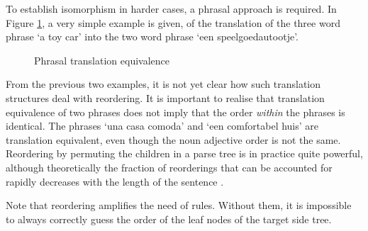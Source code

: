 \documentclass{report}
\theoremstyle{break}
\begin{document}
To establish isomorphism in harder cases, a phrasal approach is required. In Figure \ref{fig:phrasal}, a very simple example is given, of the translation of the three word phrase `a toy car' into the two word phrase `een speelgoedautootje'.

\begin{figure}[!ht]
\centering
{}
\caption{Phrasal translation equivalence}\label{fig:phrasal}
\end{figure}

From the previous two examples, it is not yet clear how such translation structures deal with reordering. It is important to realise that translation equivalence of two phrases does not imply that the order \textit{within} the phrases is identical. The phrases `una casa comoda' and `een comfortabel huis' are translation equivalent, even though the noun adjective order is not the same. Reordering by permuting the children in a parse tree is in practice quite powerful, although theoretically the fraction of reorderings that can be accounted for rapidly decreases with the length of the sentence \citep{satta2005some}.

Note that reordering amplifies the need of rules. Without them, it is impossible to always correctly guess the order of the leaf nodes of the target side tree.
\end{document}
